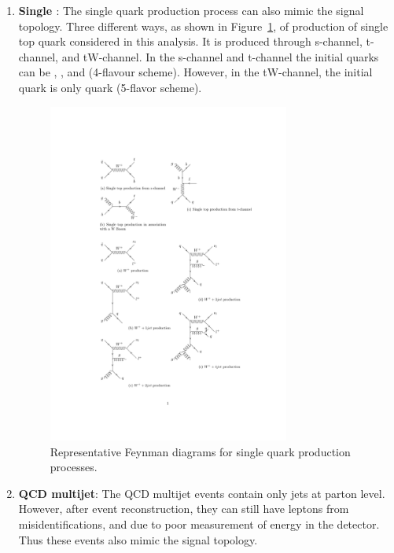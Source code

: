 \begin{enumerate}[leftmargin=*]
\item {\bf{Single \PQt}}: The single \PQt quark production process can also mimic the signal 
	topology. Three different ways, as shown in Figure~\ref{fig:feyn_diag_st}, 
	of production of single top quark considered in this analysis. It is produced through 
	s-channel, t-channel, and tW-channel. In the s-channel and t-channel the initial quarks 
	can be \PQu, \PQd, \PQc and \PQs (4-flavour scheme). However, in the tW-channel, 
	the initial quark is only \PQb quark (5-flavor scheme).
	\begin{figure}
	\begin{center}
	\includegraphics[width=0.75\textwidth]{Image/FeynDiag/feyn_diag_st.pdf}
	\caption{Representative Feynman diagrams for single \PQt quark production processes.}
	\label{fig:feyn_diag_st}
	\end{center}
	\end{figure}

\item {\bf{QCD multijet}}: The QCD multijet events contain only jets at parton level. However, after
	event reconstruction, they can still have leptons from misidentifications, and \MET due to 
	poor measurement of energy in the detector. Thus these events also mimic the signal topology.


\end{enumerate}

